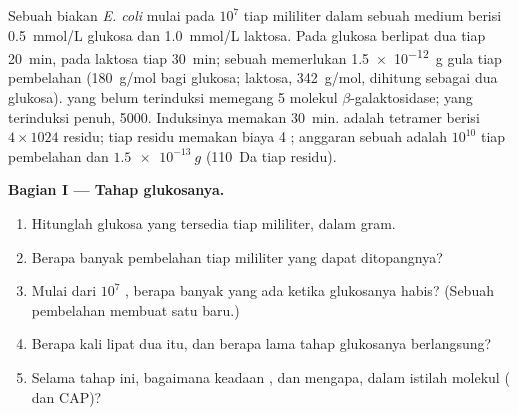 \begin{problem}
\label{pb:b1:expression-control:1}
Sebuah biakan \emph{E. coli} mulai pada $10^7$  tiap mililiter dalam
sebuah medium berisi \qty{0.5}{mmol/L} glukosa dan \qty{1.0}{mmol/L}
laktosa. Pada glukosa  berlipat dua tiap \qty{20}{min}, pada
laktosa tiap \qty{30}{min}; sebuah  memerlukan \qty{1.5e-12}{g} gula
tiap pembelahan (\qty{180}{g/mol} bagi glukosa; laktosa,
\qty{342}{g/mol}, dihitung sebagai dua glukosa).  yang belum
terinduksi memegang 5 molekul $\beta$-galaktosidase; yang terinduksi
penuh, \num{5000}. Induksinya memakan \qty{30}{min}.  adalah
tetramer berisi $4\times 1024$ residu; tiap residu memakan biaya 4 ;
anggaran  sebuah  adalah $10^{10}$ tiap pembelahan dan 
$\qty{1.5e-13}{g}$ (\qty{110}{Da} tiap residu).

\medskip
\noindent\textbf{Bagian I --- Tahap glukosanya.}
\begin{enumerate}
  \item Hitunglah glukosa yang tersedia tiap mililiter, dalam gram.
  \item Berapa banyak pembelahan tiap mililiter yang dapat
        ditopangnya?
  \item Mulai dari $10^7$ , berapa banyak  yang ada ketika
        glukosanya habis? (Sebuah pembelahan membuat satu  baru.)
  \item Berapa kali lipat dua itu, dan berapa lama tahap glukosanya
        berlangsung?
  \item Selama tahap ini, bagaimana keadaan , dan
        mengapa, dalam istilah molekul ( dan CAP)?
\end{enumerate}


\end{problem}
